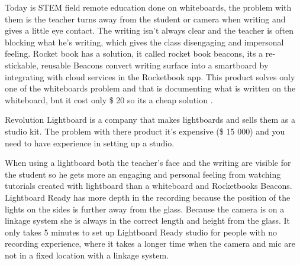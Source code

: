 \documentclass[a4paper]{jpconf}
\begin{document}
Today is STEM field remote education done on whiteboards, the problem with them is the teacher turns away from the student or camera when writing and gives a little eye contact. The writing isn't always clear and the teacher is often blocking what he's writing, which gives the class disengaging and impersonal feeling. 
Rocket book has a solution, it called rocket book beacons, its a re-stickable, reusable Beacons convert writing surface into a smartboard by integrating with cloud services in the Rocketbook app.
This product solves only one of the whiteboards problem and that is documenting what is written on the whiteboard, but it cost only \$ 20 so its a cheap solution \cite{Rocketbook}.

Revolution Lightboard is a company that makes lightboards and sells them as a studio kit. The problem with there product it's expensive (\$ 15 000) and you need to have experience in setting up a studio\cite{Revolution}.

When using a lightboard both the teacher's face and the writing are visible for the student so he gets more an engaging and personal feeling from watching tutorials created with lightboard than a whiteboard and Rocketbooks Beacons.
Lightboard Ready has more depth in the recording because the position of the lights on the sides is further away from the glass.
Because the camera is on a linkage system she is always in the correct length and height from the glass.  
It only takes 5 minutes to set up Lightboard Ready studio for people with no recording experience, where it takes a longer time when the camera and mic are not in a fixed location with a linkage system.

\end{document}
